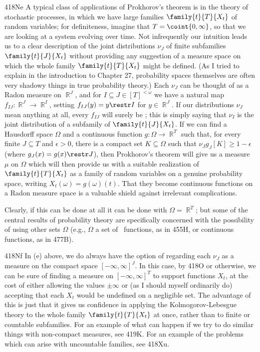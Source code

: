 {\spheader 418Ne A typical class of applications of Prokhorov's
theorem is in the theory of stochastic processes, in which we have large
families $\family{t}{T}{X_t}$ of random variables;  for definiteness,
imagine that $T=\coint{0,\infty}$, so that we are looking at a system
evolving over time.   Not infrequently our intuition leads us to a clear
description of the joint distributions $\nu_J$ of finite subfamilies
$\family{t}{J}{X_t}$ without providing any suggestion of a measure space
on which the whole family $\family{t}{T}{X_t}$ might be defined.   (As I
tried to explain in the introduction to Chapter 27, probability spaces
themselves
are often very shadowy things in true probability theory.)   Each
$\nu_J$ can be thought of as a Radon measure on $\BbbR^J$, and for
$I\subseteq J\in[T]^{<\omega}$ we have a natural map
$f_{IJ}:\BbbR^J\to\BbbR^I$,
setting $f_{IJ}(y)=y\restr I$ for $y\in\BbbR^J$.   If our distributions
$\nu_J$ mean anything at all, every $f_{IJ}$ will surely be \imp;  this
is simply saying that $\nu_I$ is the joint distribution of a subfamily
of $\family{t}{J}{X_t}$.   If we can find a Hausdorff space $\Omega$ and
a continuous function $g:\Omega\to\BbbR^T$ such that, for every finite
$J\subseteq T$ and $\epsilon>0$, there is a compact set
$K\subseteq\Omega$
such that $\nu_Jg_J[K]\ge 1-\epsilon$ (where $g_J(x)=g(x)\restr J$),
then Prokhorov's theorem will give us a measure $\mu$ on $\Omega$ which
will then provide us with a suitable realization of $\family{t}{T}{X_t}$
as a family of random variables on a genuine probability space, writing
$X_t(\omega)=g(\omega)(t)$.   That they become continuous functions on a
Radon measure space is a valuable shield against irrelevant
complications.

Clearly, if this can be done at all it can be done with
$\Omega=\BbbR^T$;  but some of the central results of probability theory
are specifically concerned with the possibility of using other sets
$\Omega$ (e.g., $\Omega$ a set of \callal\ functions, as in 455H, or
continuous functions, as in 477B).

\spheader 418Nf In (e) above, we do always have the option of
regarding each $\nu_J$ as a measure on the compact space
$[-\infty,\infty]^J$.   In this case, by 418O or otherwise, we can be
sure of finding a measure
on $[-\infty,\infty]^T$ to support functions $X_t$, at the cost of
either allowing the values $\pm\infty$ or (as I should myself ordinarily
do) accepting that each $X_t$ would be undefined on a negligible set.
The advantage of this is just that it gives us confidence in applying
the Kolmogorov-Lebesgue theory to the whole family $\family{t}{T}{X_t}$
at once, rather than to finite or countable subfamilies.   For an
example of what can happen if we try to do similar things with
non-compact measures, see 419K.   For an example of the problems which
can arise with uncountable families, see 418Xu.
}%

